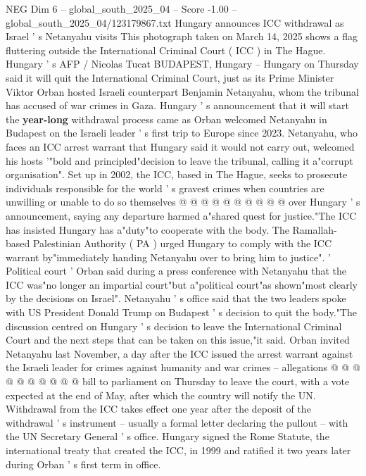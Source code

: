 \begin{textsample}{NEG Dim 6 – global\_south\_2025\_04 – Score -1.00 – global\_south\_2025\_04/123179867.txt}  \label{ex:f6_neg_169}
Hungary announces ICC withdrawal as Israel ' s Netanyahu visits This photograph taken on March 14, 2025 shows a flag fluttering outside the International Criminal Court ( ICC ) in The Hague.
Hungary ' s AFP / Nicolas Tucat BUDAPEST, Hungary -- Hungary on Thursday said it will quit the International Criminal Court, just as its Prime Minister Viktor Orban hosted Israeli counterpart Benjamin Netanyahu, whom the tribunal has accused of war crimes in Gaza.
Hungary ' s announcement that it will start the \textbf{year-long} withdrawal process came as Orban welcomed Netanyahu in Budapest on the Israeli leader ' s first trip to Europe since 2023.
Netanyahu, who faces an ICC arrest warrant that Hungary said it would not carry out, welcomed his hosts '"bold and principled"decision to leave the tribunal, calling it a"corrupt organisation".
Set up in 2002, the ICC, based in The Hague, seeks to prosecute individuals responsible for the world ' s gravest crimes when countries are unwilling or unable to do so themselves @ @ @ @ @ @ @ @ @ @ over Hungary ' s announcement, saying any departure harmed a"shared quest for justice."The ICC has insisted Hungary has a"duty"to cooperate with the body.
The Ramallah-based Palestinian Authority ( PA ) urged Hungary to comply with the ICC warrant by"immediately handing Netanyahu over to bring him to justice". ' Political court ' Orban said during a press conference with Netanyahu that the ICC was"no longer an impartial court"but a"political court"as shown"most clearly by the decisions on Israel".
Netanyahu ' s office said that the two leaders spoke with US President Donald Trump on Budapest ' s decision to quit the body."The discussion centred on Hungary ' s decision to leave the International Criminal Court and the next steps that can be taken on this issue,"it said.
Orban invited Netanyahu last November, a day after the ICC issued the arrest warrant against the Israeli leader for crimes against humanity and war crimes -- allegations @ @ @ @ @ @ @ @ @ @ bill to parliament on Thursday to leave the court, with a vote expected at the end of May, after which the country will notify the UN.
Withdrawal from the ICC takes effect one year after the deposit of the withdrawal ' s instrument -- usually a formal letter declaring the pullout -- with the UN Secretary General ' s office.
Hungary signed the Rome Statute, the international treaty that created the ICC, in 1999 and ratified it two years later during Orban ' s first term in office.

\end{textsample}
